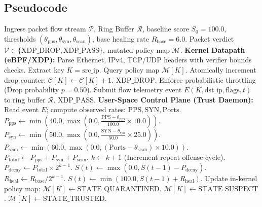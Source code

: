 \documentclass[conference]{IEEEtran}
\begin{document}
\subsection{Pseudocode}
\begin{algorithmic}[1]
\REQUIRE Ingress packet flow stream $\mathcal{P}$, Ring Buffer $\mathcal{R}$, baseline score $S_0=100.0$, thresholds $(\theta_{\text{pps}}, \theta_{\text{syn}}, \theta_{\text{scan}})$, base healing rate $R_{\text{base}} = 6.0$.
\ENSURE Packet verdict $\mathcal{V} \in \{\text{XDP\_DROP}, \text{XDP\_PASS}\}$, mutated policy map $\mathcal{M}$.
\STATE \textbf{Kernel Datapath (eBPF/XDP):}
\STATE Parse Ethernet, IPv4, TCP/UDP headers with verifier bounds checks.
\STATE Extract key $K = \text{src\_ip}$.
\STATE Query policy map $\mathcal{M}[K]$.
    \STATE Atomically increment drop counter: $\mathcal{C}[K] \leftarrow \mathcal{C}[K] + 1$.
    \RETURN $\text{XDP\_DROP}$.
    \STATE Enforce probabilistic throttling (Drop probability $p=0.50$).
\ENDIF
\STATE Submit flow telemetry event $E(K, \text{dst\_ip}, \text{flags}, t)$ to ring buffer $\mathcal{R}$.
\RETURN $\text{XDP\_PASS}$.
\STATE
\STATE \textbf{User-Space Control Plane (Trust Daemon):}
    \STATE Read event $E$; compute observed rates: $\text{PPS}, \text{SYN}, \text{Ports}$.
    \STATE $P_{\text{pps}} \leftarrow \min(40.0, \max(0.0, \frac{\text{PPS} - \theta_{\text{pps}}}{100.0} \times 10.0))$.
    \STATE $P_{\text{syn}} \leftarrow \min(50.0, \max(0.0, \frac{\text{SYN} - \theta_{\text{syn}}}{50.0} \times 25.0))$.
    \STATE $P_{\text{scan}} \leftarrow \min(60.0, \max(0.0, (\text{Ports} - \theta_{\text{scan}}) \times 10.0))$.
    \STATE $P_{\text{total}} \leftarrow P_{\text{pps}} + P_{\text{syn}} + P_{\text{scan}}$.
        \STATE $k \leftarrow k + 1$ (Increment repeat offense cycle).
        \STATE $P_{\text{decay}} \leftarrow P_{\text{total}} \times 2^{k-1}$.
        \STATE $S(t) \leftarrow \max(0.0, S(t-1) - P_{\text{decay}})$.
    \ELSE
        \STATE $R_{\text{heal}} \leftarrow R_{\text{base}} / 2^{k-1}$.
        \STATE $S(t) \leftarrow \min(100.0, S(t-1) + R_{\text{heal}})$.
    \ENDIF
    \STATE Update in-kernel policy map:
        \STATE $\mathcal{M}[K] \leftarrow \text{STATE\_QUARANTINED}$.
        \STATE $\mathcal{M}[K] \leftarrow \text{STATE\_SUSPECT}$.
    \ELSE
        \STATE $\mathcal{M}[K] \leftarrow \text{STATE\_TRUSTED}$.
    \ENDIF
\ENDWHILE
\end{algorithmic}
\end{document}
